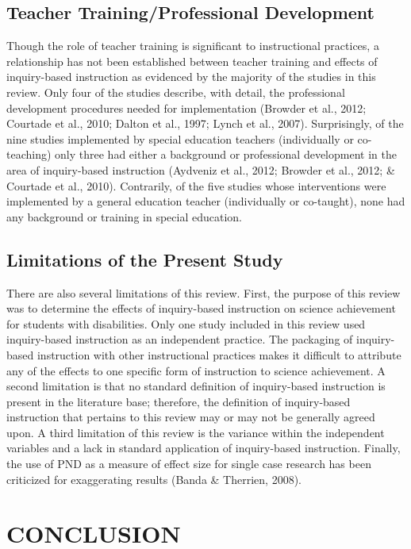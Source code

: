 \documentclass[11.5pt]{sig-alternate} %
\begin{document}
\begin{large}
\subsection*{Teacher Training/Professional Development}

Though the role of teacher training is significant to instructional practices, a relationship has not been established between teacher training and effects of inquiry-based instruction as evidenced by the majority of the studies in this review.  Only four of the studies describe, with detail, the professional development procedures needed for implementation (Browder et al., 2012; Courtade et al., 2010; Dalton et al., 1997; Lynch et al., 2007).  Surprisingly, of the nine studies implemented by special education teachers (individually or co-teaching) only three had either a background or professional development in the area of inquiry-based instruction (Aydveniz et al., 2012; Browder et al., 2012; \& Courtade et al., 2010).  Contrarily, of the five studies whose interventions were implemented by a general education teacher (individually or co-taught), none had any background or training in special education.  

\subsection*{Limitations of the Present Study}

There are also several limitations of this review.  First, the purpose of this review was to determine the effects of inquiry-based instruction on science achievement for students with disabilities. Only one study included in this review used inquiry-based instruction as an independent practice.  The packaging of inquiry-based instruction with other instructional practices makes it difficult to attribute any of the effects to one specific form of instruction to science achievement.  A second limitation is that no standard definition of inquiry-based instruction is present in the literature base; therefore, the definition of inquiry-based instruction that pertains to this review may or may not be generally agreed upon.  A third limitation of this review is the variance within the independent variables and a lack in standard application of inquiry-based instruction.  Finally, the use of PND as a measure of effect size for single case research has been criticized for exaggerating results (Banda \& Therrien, 2008).

\section*{CONCLUSION}


\end{large}
\end{document}
